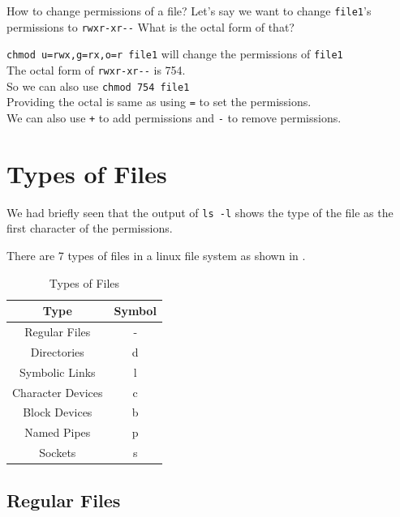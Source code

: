 \begin{qs}
  How to change permissions of a file?
  Let's say we want to change \lstinline|file1|'s permissions to \lstinline|rwxr-xr--|
  What is the octal form of that?
\end{qs}

\begin{ans}
  \lstinline|chmod u=rwx,g=rx,o=r file1| will change the permissions of \lstinline|file1|\\
  The octal form of \lstinline|rwxr-xr--| is 754.\\
  So we can also use \lstinline|chmod 754 file1|\\
  Providing the octal is same as using \lstinline|=| to set the permissions.\\
  We can also use \lstinline|+| to add permissions and \lstinline|-| to remove permissions.
\end{ans}


\vfill
\pagebreak
\section{Types of Files}

We had briefly seen that the output of \lstinline|ls -l| shows the type of the file as the first character of the permissions.

There are 7 types of files in a linux file system as shown in .

\begin{table}
\caption{Types of Files}
\begin{tabular}{ c c }
  \toprule
  Type & Symbol \\
 \midrule
  Regular Files & -{} \\
  Directories & d \\
  Symbolic Links & l \\
  Character Devices & c \\
  Block Devices & b \\
  Named Pipes & p \\
  Sockets & s \\
 \bottomrule
\end{tabular}
\end{table}

\subsection{Regular Files}

